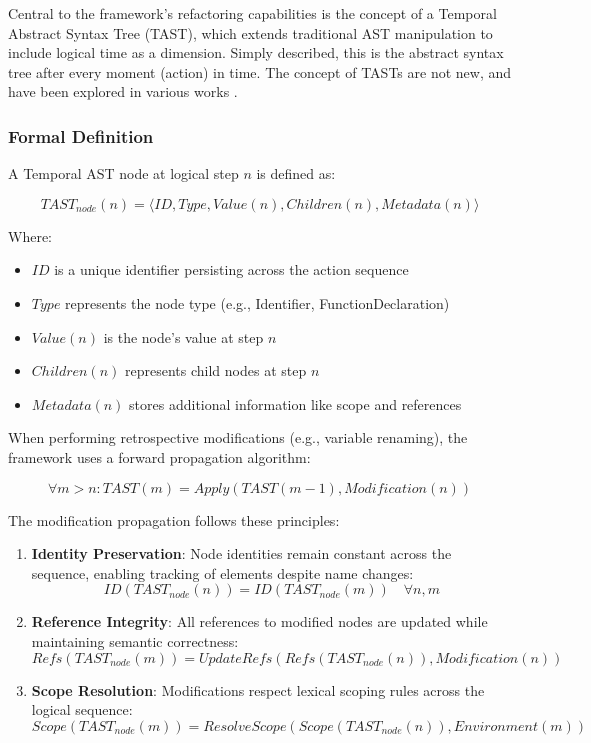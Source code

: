 \documentclass[11pt, a4paper]{article}
\begin{document}
Central to the framework's refactoring capabilities is the concept of a Temporal Abstract Syntax Tree (TAST), which extends traditional AST manipulation to include logical time as a dimension. Simply described, this is the abstract syntax tree after every moment (action) in time. The concept of TASTs are not new, and have been explored in various works \cite{moore2022temporal}.

\subsubsection{Formal Definition}

A Temporal AST node at logical step \(n\) is defined as:

\[
TAST_{node}(n) = \langle ID, Type, Value(n), Children(n), Metadata(n) \rangle
\]

Where:
\begin{itemize}
    \item \(ID\) is a unique identifier persisting across the action sequence
    \item \(Type\) represents the node type (e.g., Identifier, FunctionDeclaration)
    \item \(Value(n)\) is the node's value at step \(n\)
    \item \(Children(n)\) represents child nodes at step \(n\)
    \item \(Metadata(n)\) stores additional information like scope and references
\end{itemize}

When performing retrospective modifications (e.g., variable renaming), the framework uses a forward propagation algorithm:

\[
\forall m > n: TAST(m) = Apply(TAST(m-1), Modification(n))
\]

The modification propagation follows these principles:

\begin{enumerate}
    \item \textbf{Identity Preservation}: Node identities remain constant across the sequence, enabling tracking of elements despite name changes:
    \[
    ID(TAST_{node}(n)) = ID(TAST_{node}(m)) \quad \forall n,m
    \]
    
    \item \textbf{Reference Integrity}: All references to modified nodes are updated while maintaining semantic correctness:
    \[
    Refs(TAST_{node}(m)) = UpdateRefs(Refs(TAST_{node}(n)), Modification(n))
    \]
    
    \item \textbf{Scope Resolution}: Modifications respect lexical scoping rules across the logical sequence:
    \[
    Scope(TAST_{node}(m)) = ResolveScope(Scope(TAST_{node}(n)), Environment(m))
    \]
\end{enumerate}
\end{document}
